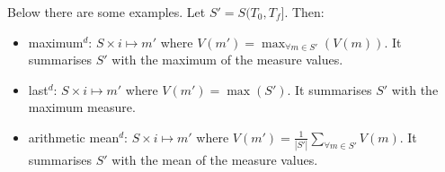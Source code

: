 

Below there are some examples. Let $S'=S(T_0,T_f]$. Then:
\begin{itemize}
\renewcommand{\labelitemi}{--}
\item maximum$^d$: $S \times i \mapsto m'$ where $V(m') =
  \max_{\forall m \in S'}(V(m))$. It summarises $S'$ with the maximum
  of the measure values.
\item last$^d$: $S \times i \mapsto m'$ where $V(m') = \max(S')$. It
  summarises $S'$ with the maximum measure.
\item arithmetic mean$^d$: $S \times i \mapsto m'$ where $V(m') =
  \frac{1}{|S'|} \sum\limits_{\forall m\in S'} V(m)$. It
  summarises $S'$ with the mean of the measure values.
\end{itemize}




